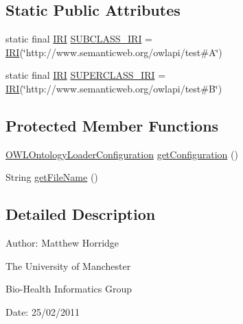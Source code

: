 \subsection*{Static Public Attributes}
\begin{DoxyCompactItemize}
\item 
static final \hyperlink{classorg_1_1semanticweb_1_1owlapi_1_1model_1_1_i_r_i}{I\-R\-I} \hyperlink{classorg_1_1semanticweb_1_1owlapi_1_1api_1_1test_1_1axioms_1_1_sub_class_of_untyped_o_w_l_class_test_case_a8c5e561996c542357147f523cabf9067}{S\-U\-B\-C\-L\-A\-S\-S\-\_\-\-I\-R\-I} = \hyperlink{classorg_1_1semanticweb_1_1owlapi_1_1model_1_1_i_r_i}{I\-R\-I}(\char`\"{}http\-://www.\-semanticweb.\-org/owlapi/test\#A\char`\"{})
\item 
static final \hyperlink{classorg_1_1semanticweb_1_1owlapi_1_1model_1_1_i_r_i}{I\-R\-I} \hyperlink{classorg_1_1semanticweb_1_1owlapi_1_1api_1_1test_1_1axioms_1_1_sub_class_of_untyped_o_w_l_class_test_case_a511ab0bcd32871e761ba433120daaa90}{S\-U\-P\-E\-R\-C\-L\-A\-S\-S\-\_\-\-I\-R\-I} = \hyperlink{classorg_1_1semanticweb_1_1owlapi_1_1model_1_1_i_r_i}{I\-R\-I}(\char`\"{}http\-://www.\-semanticweb.\-org/owlapi/test\#B\char`\"{})
\end{DoxyCompactItemize}
\subsection*{Protected Member Functions}
\begin{DoxyCompactItemize}
\item 
\hyperlink{classorg_1_1semanticweb_1_1owlapi_1_1model_1_1_o_w_l_ontology_loader_configuration}{O\-W\-L\-Ontology\-Loader\-Configuration} \hyperlink{classorg_1_1semanticweb_1_1owlapi_1_1api_1_1test_1_1axioms_1_1_sub_class_of_untyped_o_w_l_class_test_case_ad926dcd927e8d21c23ad4c1c8f30407b}{get\-Configuration} ()
\item 
String \hyperlink{classorg_1_1semanticweb_1_1owlapi_1_1api_1_1test_1_1axioms_1_1_sub_class_of_untyped_o_w_l_class_test_case_a2755b9dd86247acfab300720ad4f4c34}{get\-File\-Name} ()
\end{DoxyCompactItemize}


\subsection{Detailed Description}
Author\-: Matthew Horridge\par
 The University of Manchester\par
 Bio-\/\-Health Informatics Group\par
 Date\-: 25/02/2011 

